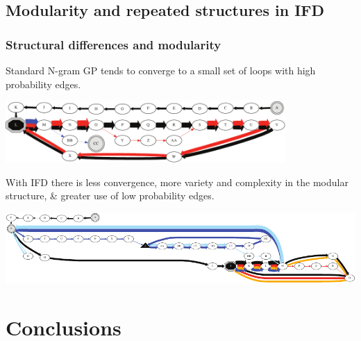 \documentclass{beamer}
\begin{document}
\subsection[Modularity]{Modularity and repeated structures in IFD}

\begin{frame}
  \frametitle{Structural differences and modularity}
  
  Standard N-gram GP tends to converge to a small set of loops with high probability edges.

  \begin{center}
  \includegraphics[width=0.8\textwidth]{Fig/FigF.pdf}
  \end{center}
  
      With IFD there is less convergence, more variety and complexity in the modular structure, \& greater use of low probability edges.
  
  \begin{center}
    \includegraphics[width=\textwidth]{Fig/FigG.pdf}
    \end{center}

\end{frame}

\section[Conclusions]{Conclusions}
\end{document}
